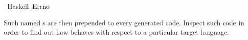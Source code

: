 \begin{isabellebody}
\isanewline
{}\isamarkupfalse%
\ Haskell\ Errno%
\endisatagquotett
{\isafoldquotett}%
%
\isadelimquotett
%
\endisadelimquotett
%
\begin{isamarkuptext}%
\noindent Such named s are then prepended to every
  generated code.  Inspect such code in order to find out how
  \hyperlink{command.code-include}{\mbox{}} behaves with respect to a particular
  target language.%
\end{isamarkuptext}%
\isamarkuptrue%
%
\isadelimtheory
%
\endisadelimtheory
%
\isatagtheory
{}\isamarkupfalse%
%
\endisatagtheory
{\isafoldtheory}%
%
\isadelimtheory
%
\endisadelimtheory
\isanewline
\isanewline
\end{isabellebody}%
